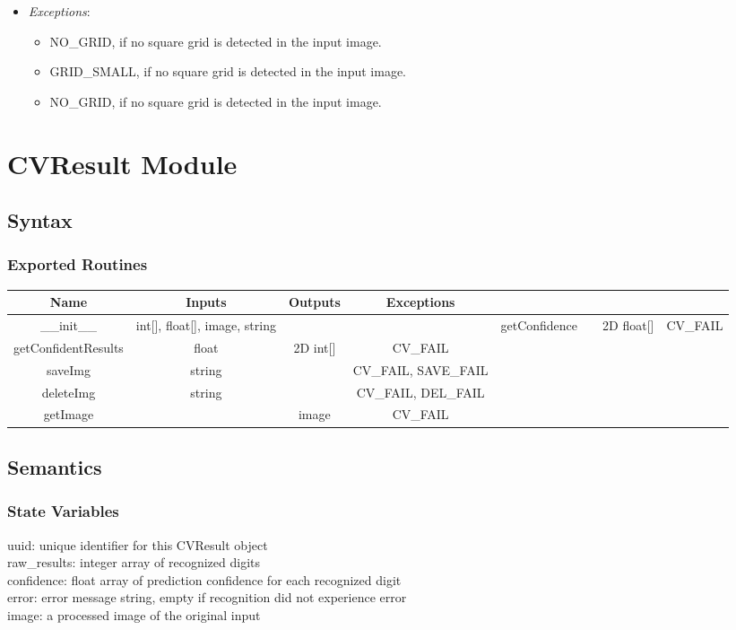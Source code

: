 \documentclass[11pt]{article}
\begin{document}
\begin{itemize}
\begin{itemize}
		    \item[] \textit{Exceptions}:
		    \begin{itemize}
		        \item NO\_GRID, if no square grid is detected in the input image.
		        \item GRID\_SMALL, if no square grid is detected in the input image.
		        \item NO\_GRID, if no square grid is detected in the input image.
		    \end{itemize}
		\end{itemize}
    \end{itemize}
			

\section{CVResult Module}
		\subsection{Syntax}
		\subsubsection{Exported Routines}
		\begin{tabular}[width=\textwidth, pos]{|c|c|c|c|}
			
			\hline
			\textbf{Name}& \textbf{Inputs} & \textbf{Outputs} & \textbf{Exceptions} \\ \hline
			\_\_init\_\_ & int[], float[], image, string &  & &
			getConfidence & & 2D float[] & CV\_FAIL \\
			getConfidentResults & float & 2D int[] & CV\_FAIL \\
			saveImg & string &  & CV\_FAIL, SAVE\_FAIL\\
		    deleteImg & string & & CV\_FAIL, DEL\_FAIL\\ 
			getImage & & image & CV\_FAIL\\

			
			\hline
			
		\end{tabular}
		
		\subsection{Semantics}
		\subsubsection{State Variables}
		uuid: unique identifier for this CVResult object \\
		raw\_results: integer array of recognized digits \\
		confidence: float array of prediction confidence for each recognized digit \\
		error: error message string, empty if recognition did not experience error \\
		image: a processed image of the original input
		
\end{document}
